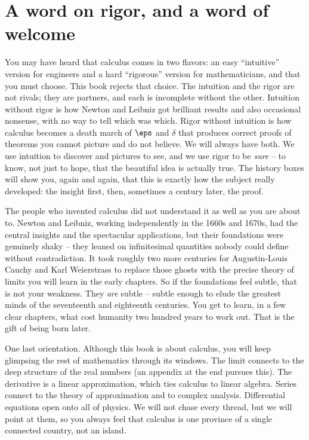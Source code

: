 \section*{A word on rigor, and a word of welcome}

You may have heard that calculus comes in two flavors: an easy ``intuitive'' version for engineers
and a hard ``rigorous'' version for mathematicians, and that you must choose. This book rejects that
choice. The intuition and the rigor are not rivals; they are partners, and each is incomplete
without the other. Intuition without rigor is how Newton and Leibniz got brilliant results and also
occasional nonsense, with no way to tell which was which. Rigor without intuition is how calculus
becomes a death march of $\eps$ and $\delta$ that produces correct proofs of theorems you cannot
picture and do not believe. We will always have both. We use intuition to discover and pictures to
see, and we use rigor to be \emph{sure} -- to know, not just to hope, that the beautiful idea is
actually true. The history boxes will show you, again and again, that this is exactly how the subject
really developed: the insight first, then, sometimes a century later, the proof.

\begin{historybox}
The people who invented calculus did not
understand it as well as you are about to. Newton and Leibniz, working independently in the 1660s and
1670s, had the central insights and the spectacular applications, but their foundations were genuinely
shaky -- they leaned on infinitesimal quantities nobody could define without contradiction. It took
roughly two more centuries for Augustin-Louis Cauchy and Karl Weierstrass to replace those ghosts
with the precise theory of limits you will learn in the early chapters. So if the foundations feel
subtle, that is not your weakness. They \emph{are} subtle -- subtle enough to elude the greatest minds
of the seventeenth and eighteenth centuries. You get to learn, in a few clear chapters, what cost
humanity two hundred years to work out. That is the gift of being born later.
\end{historybox}

\begin{connectionbox}
One last orientation. Although this book is about calculus, you will keep glimpsing the rest of
mathematics through its windows. The limit connects to the deep structure of the real numbers (an
appendix at the end pursues this). The derivative is a linear approximation, which ties calculus to
linear algebra. Series connect to the theory of approximation and to complex analysis. Differential
equations open onto all of physics. We will not chase every thread, but we will point at them, so you
always feel that calculus is one province of a single connected country, not an island.
\end{connectionbox}

